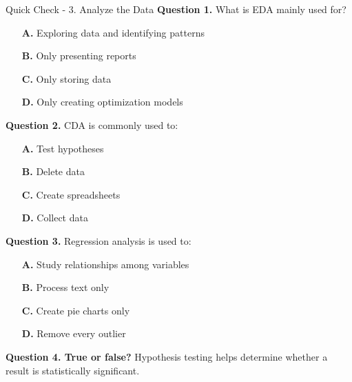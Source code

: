 \documentclass[aspectratio=169,11pt]{beamer}
\begin{document}
\begin{frame}[allowframebreaks]{Quick Check - 3. Analyze the Data}
\footnotesize
\textbf{Question 1.} What is EDA mainly used for?\par\medskip
\begin{itemize}
\item[\textbf{A.}] Exploring data and identifying patterns
\item[\textbf{B.}] Only presenting reports
\item[\textbf{C.}] Only storing data
\item[\textbf{D.}] Only creating optimization models
\end{itemize}
\textbf{Question 2.} CDA is commonly used to:\par\medskip
\begin{itemize}
\item[\textbf{A.}] Test hypotheses
\item[\textbf{B.}] Delete data
\item[\textbf{C.}] Create spreadsheets
\item[\textbf{D.}] Collect data
\end{itemize}
\textbf{Question 3.} Regression analysis is used to:\par\medskip
\begin{itemize}
\item[\textbf{A.}] Study relationships among variables
\item[\textbf{B.}] Process text only
\item[\textbf{C.}] Create pie charts only
\item[\textbf{D.}] Remove every outlier
\end{itemize}
\textbf{Question 4. True or false?} Hypothesis testing helps determine whether a result is statistically significant.\par\medskip
\end{frame}
\end{document}
